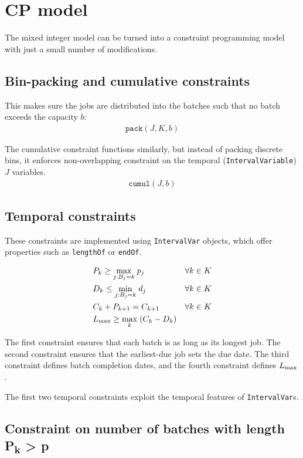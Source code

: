 \section{CP model}

The mixed integer model can be turned into a constraint programming model with
just a small number of modifications.

\subsection{Bin-packing and cumulative constraints} This makes sure the jobs are
distributed into the batches such that no batch exceeds the capacity $b$:
\begin{align} \mathtt{pack}(J, K, b) \end{align}

The cumulative constraint functions similarly, but instead of packing discrete
bins, it enforces non-overlapping constraint on the temporal
(\texttt{IntervalVariable}) $J$ variables.  \begin{align} \mathtt{cumul}(J, b)
\end{align}

\subsection{Temporal constraints} These constraints are implemented using
\texttt{IntervalVar} objects, which offer properties such as \texttt{lengthOf}
or \texttt{endOf}.

\begin{alignat}{2} & P_k \geq \underset{j : B_j = k}{\max} \; p_j \quad &&
\forall k \in K \\ & D_k \leq \underset{j : B_j = k}{\min}\; d_j \quad &&
\forall k \in K \\ & C_k + P_{k+1} = C_{k+1} \quad && \forall k \in K \\ & L_{\text{max}}
\geq \underset{k}{\max} \;(C_k - D_k) && \end{alignat}

The first constraint ensures that each batch is as long as its longest job.  The
second constraint ensures that the earliest-due job sets the due date.  The
third constraint defines batch completion dates, and the fourth constraint
defines $L_{\text{max}}$.

The first two temporal constraints exploit the temporal features of
\texttt{IntervalVar}s.

\subsection[Constraint on the number of batches with length $P_k >
p$]{Constraint on number of batches with length {\sansitalicfont
P\textsubscript{k}} > {\sansitalicfont p}}

